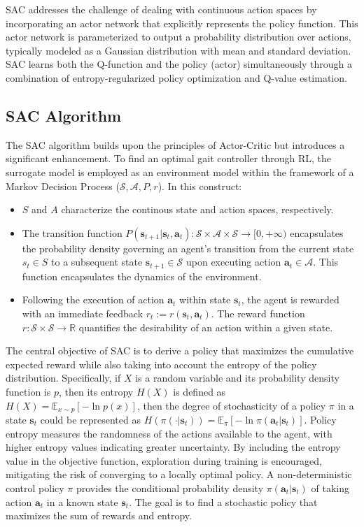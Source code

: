 SAC addresses the challenge of dealing with continuous action spaces by incorporating an actor network that explicitly represents the policy function. This actor network is parameterized to output a probability distribution over actions, typically modeled as a Gaussian distribution with mean and standard deviation. SAC learns both the Q-function and the policy (actor) simultaneously through a combination of entropy-regularized policy optimization and Q-value estimation.

\subsection{SAC Algorithm}
The \ac{SAC} algorithm builds upon the principles of Actor-Critic but introduces a significant enhancement. To find an optimal gait controller through RL, the surrogate model is employed as an environment model within the framework of a Markov Decision Process ($\mathcal{S}, \mathcal{A}, P, r$). In this construct:
\begin{itemize} 
    \item $S$ and $A$ characterize the continous state and action spaces, respectively.
    \item The transition function $P(\mathbf{s}_{t+1} | \mathbf{s}_t, \mathbf{a}_t): \mathcal{S} \times \mathcal{A} \times \mathcal{S} \rightarrow [0,+\infty)$ encapsulates the probability density governing an agent's transition from the current state $s_t \in S$ to a subsequent state $\mathbf{s}_{t+1} \in \mathcal{S}$ upon executing action $\mathbf{a}_t \in \mathcal{A}$. This function encapsulates the dynamics of the environment.
    \item Following the execution of action $\mathbf{a}_t$ within state $\mathbf{s}_t$, the agent is rewarded with an immediate feedback $r_t := r(\mathbf{s}_t, \mathbf{a}_t)$. The reward function $r: \mathcal{S} \times \mathcal{S} \to \mathbb{R}$ quantifies the desirability of an action within a given state.
\end{itemize}

The central objective of SAC is to derive a policy that maximizes the cumulative expected reward while also taking into account the entropy of the policy distribution. Specifically, if $X$ is a random variable and its probability density function is $p$, then its entropy $H(X)$ is defined as $H(X) = \mathbb{E}_{x\sim p}[-\ln p(x)]$, then the degree of stochasticity of a policy $\pi$ in a state $\mathbf{s}_t$ could be represented as $H(\pi(\cdot|\mathbf{s}_t)) = \mathbb{E}_\pi[-\ln \pi(\mathbf{a}_t|\mathbf{s}_t)]$. Policy entropy measures the randomness of the actions available to the agent, with higher entropy values indicating greater uncertainty. By including the entropy value in the objective function, exploration during training is encouraged, mitigating the risk of converging to a locally optimal policy. A non-deterministic control policy $\pi$ provides the conditional probability density $\pi(\mathbf{a}_t|\mathbf{s}_t)$ of taking action $\mathbf{a}_t$ in a known state $\mathbf{s}_t$. The goal is to find a stochastic policy that maximizes the sum of rewards and entropy. 

